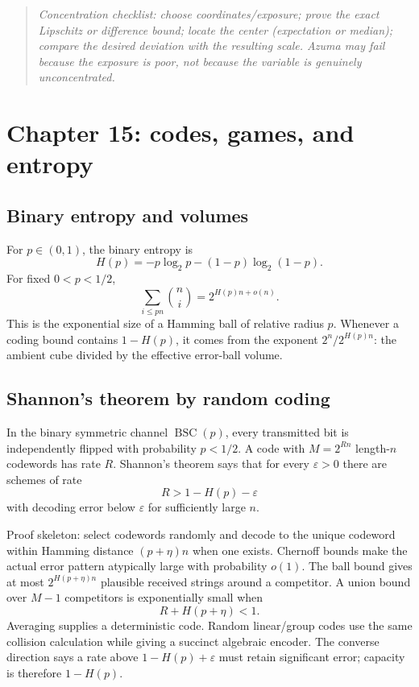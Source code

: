 \documentclass[10pt]{article}
\newcommand{\1}{\mathbf 1}
\newenvironment{keybox}{\begin{quote}\small\itshape}{\end{quote}}
\begin{document}
\begin{keybox}
Concentration checklist: choose coordinates/exposure; prove the exact Lipschitz
or difference bound; locate the center (expectation or median); compare the
desired deviation with the resulting scale.  Azuma may fail because the
exposure is poor, not because the variable is genuinely unconcentrated.
\end{keybox}

\section{Chapter 15: codes, games, and entropy}

\subsection{Binary entropy and volumes}

For $p\in(0,1)$, the binary entropy is
\[
 H(p)=-p\log_2p-(1-p)\log_2(1-p).
\]
For fixed $0<p<1/2$,
\[
 \sum_{i\leq pn}\binom ni=2^{H(p)n+o(n)}.
\]
This is the exponential size of a Hamming ball of relative radius $p$.
Whenever a coding bound contains $1-H(p)$, it comes from the exponent
$2^n/2^{H(p)n}$: the ambient cube divided by the effective error-ball volume.

\subsection{Shannon's theorem by random coding}

In the binary symmetric channel $\operatorname{BSC}(p)$, every transmitted bit
is independently flipped with probability $p<1/2$.  A code with $M=2^{Rn}$
length-$n$ codewords has rate $R$.  Shannon's theorem says that for every
$\varepsilon>0$ there are schemes of rate
\[
 R>1-H(p)-\varepsilon
\]
with decoding error below $\varepsilon$ for sufficiently large $n$.

Proof skeleton: select codewords randomly and decode to the unique codeword
within Hamming distance $(p+\eta)n$ when one exists.  Chernoff bounds make the
actual error pattern atypically large with probability $o(1)$.  The ball bound
gives at most $2^{H(p+\eta)n}$ plausible received strings around a competitor.
A union bound over $M-1$ competitors is exponentially small when
\[
 R+H(p+\eta)<1.
\]
Averaging supplies a deterministic code.  Random linear/group codes use the
same collision calculation while giving a succinct algebraic encoder.
The converse direction says a rate above $1-H(p)+\varepsilon$ must retain
significant error; capacity is therefore $1-H(p)$.
\end{document}
